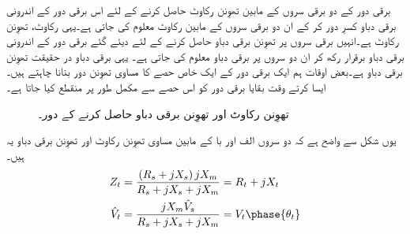 برقی دور کے دو برقی سروں کے مابین تھوِنن رکاوٹ حاصل کرنے کے لئے  اس برقی دور کے اندرونی برقی دباو کسرِ دور کر کے ان دو برقی سروں کے مابین رکاوٹ معلوم کی جاتی ہے۔یہی رکاوٹ، تھوِنن رکاوٹ ہے۔انہیں برقی سروں پر تھوِنن برقی دباو حاصل کرنے کے لئے دیئے گئے برقی دور کے اندرونی برقی دباو برقرار رکھ کر ان دو سروں پر برقی دباو معلوم کی جاتی ہے۔ یہی برقی دباو در حقیقت تھوِنن برقی دباو ہے۔بعض اوقات ہم ایک برقی دور کے ایک خاص حصے کا مساوی تھوِنن دور بنانا چاہتے ہیں۔ایسا کرتے وقت بقایا برقی دور کو اس حصے سے مکمل طور پر منقطع کیا جاتا ہے۔
\begin{figure}
\centering
\caption{تھوِنن رکاوٹ اور تھوِنن برقی دباو حاصل کرنے کے دور۔}
\label{شکل_امالی_تھونن_رکاوٹ_اور_دباو}
\end{figure}
یوں شکل   سے واضح ہے کہ دو سروں الف اور با کے مابین مساوی تھوِنن  رکاوٹ اور تھوِنن برقی دباو یہ ہیں۔
\begin{gather}
\begin{aligned}\label{مساوات_امالی_تھونن_متغرات}
Z_t&=\frac{\left(R_s+j X_s \right) j X_m}{R_s +j X_s + j X_m}=R_t+j X_t\\
\hat{V}_t&=\frac{j X_m \hat{V}_s}{R_s +j X_s + j X_m}=V_t \phase{\theta_t}
\end{aligned}
\end{gather}
